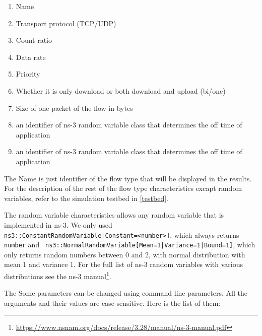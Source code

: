 \begin{enumerate}
	\item Name
	\item Transport protocol (TCP/UDP)
	\item Count ratio
	\item Data rate
	\item Priority
	\item Whether it is only download or both download and upload (bi/one)
	\item Size of one packet of the flow in bytes
	\item an identifier of ns-3 random variable class that determines the off time of application
	\item an identifier of ns-3 random variable class that determines the off time of application
\end{enumerate}

The Name is just identifier of the flow type that will be displayed in the results. For the description of the rest of the flow type characteristics excapt random variables, refer to the simulation testbed in \autoref{testbed}.

The random variable characteristics allows any random variable that is implemented in ns-3. We only used \\ \texttt{\small ns3::ConstantRandomVariable[Constant=<number>]}, which always returns \\ \texttt{\small number} and \texttt{ ns3::NormalRandomVariable[Mean=1|Variance=1|Bound=1]}, which only returns random numbers between 0 and 2, with normal distribution with mean 1 and variance 1. For the full list of ns-3 random variables with various distributions see the ns-3 manual\footnote{\url{https://www.nsnam.org/docs/release/3.28/manual/ns-3-manual.pdf}}.

The Some parameters can be changed using command line parameters. All the arguments and their values are case-sensitive. Here is the list of them: 

